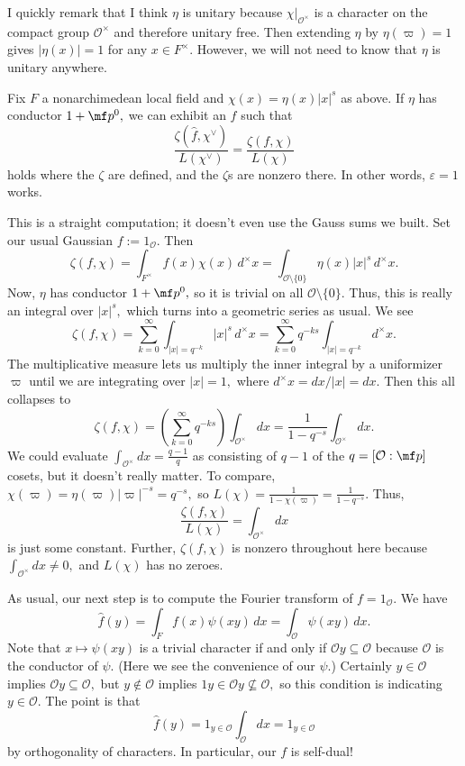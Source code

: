 I quickly remark that I think $\eta$ is unitary because $\chi|_{\mathcal O^\times}$ is a character on the compact group $\mathcal O^\times$ and therefore unitary free. Then extending $\eta$ by $\eta(\varpi)=1$ gives $|\eta(x)|=1$ for any $x\in F^\times.$ However, we will not need to know that $\eta$ is unitary anywhere.
\begin{proposition}
    Fix $F$ a nonarchimedean local field and $\chi(x)=\eta(x)|x|^s$ as above. If $\eta$ has conductor $1+\mf p^0,$ we can exhibit an $f$ such that
    \[\frac{\zeta(\hat f,\chi^\vee)}{L(\chi^\vee)}=\frac{\zeta(f,\chi)}{L(\chi)}\]
    holds where the $\zeta$ are defined, and the $\zeta$s are nonzero there. In other words, $\varepsilon=1$ works.
\end{proposition}
This is a straight computation; it doesn't even use the Gauss sums we built. Set our usual Gaussian $f:=1_{\mathcal O}.$ Then
\[\zeta(f,\chi)=\int_{F^\times}f(x)\chi(x)\,d^\times x=\int_{\mathcal O\setminus\{0\}}\eta(x)|x|^s\,d^\times x.\]
Now, $\eta$ has conductor $1+\mf p^0,$ so it is trivial on all $\mathcal O\setminus\{0\}.$ Thus, this is really an integral over $|x|^s,$ which turns into a geometric series as usual. We see
\[\zeta(f,\chi)=\sum_{k=0}^\infty\int_{|x|=q^{-k}}|x|^s\,d^\times x=\sum_{k=0}^\infty q^{-ks}\int_{|x|=q^{-k}}d^\times x.\]
The multiplicative measure lets us multiply the inner integral by a uniformizer $\varpi$ until we are integrating over $|x|=1,$ where $d^\times x=dx/|x|=dx.$ Then this all collapses to
\[\zeta(f,\chi)=\left(\sum_{k=0}^\infty q^{-ks}\right)\int_{\mathcal O^\times}dx=\frac1{1-q^{-s}}\int_{\mathcal O^\times}dx.\]
We could evaluate $\int_{\mathcal O^\times}dx=\frac{q-1}q$ as consisting of $q-1$ of the $q=[\mathcal O:\mf p]$ cosets, but it doesn't really matter. To compare, $\chi(\varpi)=\eta(\varpi)|\varpi|^{-s}=q^{-s},$ so $L(\chi)=\frac1{1-\chi(\varpi)}=\frac1{1-q^{-s}}.$ Thus,
\[\frac{\zeta(f,\chi)}{L(\chi)}=\int_{\mathcal O^\times}dx\]
is just some constant. Further, $\zeta(f,\chi)$ is nonzero throughout here because $\int_{\mathcal O^\times}dx\ne0,$ and $L(\chi)$ has no zeroes.

As usual, our next step is to compute the Fourier transform of $f=1_{\mathcal O}.$ We have
\[\hat f(y)=\int_Ff(x)\psi(xy)\,dx=\int_{\mathcal O}\psi(xy)\,dx.\]
Note that $x\mapsto\psi(xy)$ is a trivial character if and only if $\mathcal Oy\subseteq\mathcal O$ because $\mathcal O$ is the conductor of $\psi.$ (Here we see the convenience of our $\psi.$) Certainly $y\in\mathcal O$ implies $\mathcal Oy\subseteq\mathcal O,$ but $y\not\in\mathcal O$ implies $1y\in\mathcal Oy\not\subseteq\mathcal O,$ so this condition is indicating $y\in\mathcal O.$ The point is that
\[\hat f(y)=1_{y\in\mathcal O}\int_{\mathcal O}dx=1_{y\in\mathcal O}\]
by orthogonality of characters. In particular, our $f$ is self-dual!

